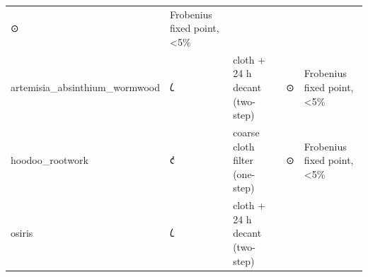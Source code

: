 \documentclass[12pt,a4paper]{article}
\begin{document}
\begin{longtable}[]{@{}lllll@{}}
\begin{minipage}[t]{0.17\columnwidth}
⊙\strut
\end{minipage} & \begin{minipage}[t]{0.17\columnwidth}\raggedright
Frobenius fixed point, \textless5\%\strut
\end{minipage}\tabularnewline
\begin{minipage}[t]{0.17\columnwidth}\raggedright
artemisia\_absinthium\_wormwood\strut
\end{minipage} & \begin{minipage}[t]{0.17\columnwidth}\raggedright
𐑖\strut
\end{minipage} & \begin{minipage}[t]{0.17\columnwidth}\raggedright
cloth + 24 h decant (two-step)\strut
\end{minipage} & \begin{minipage}[t]{0.17\columnwidth}\raggedright
⊙\strut
\end{minipage} & \begin{minipage}[t]{0.17\columnwidth}\raggedright
Frobenius fixed point, \textless5\%\strut
\end{minipage}\tabularnewline
\begin{minipage}[t]{0.17\columnwidth}\raggedright
hoodoo\_rootwork\strut
\end{minipage} & \begin{minipage}[t]{0.17\columnwidth}\raggedright
𐑒\strut
\end{minipage} & \begin{minipage}[t]{0.17\columnwidth}\raggedright
coarse cloth filter (one-step)\strut
\end{minipage} & \begin{minipage}[t]{0.17\columnwidth}\raggedright
⊙\strut
\end{minipage} & \begin{minipage}[t]{0.17\columnwidth}\raggedright
Frobenius fixed point, \textless5\%\strut
\end{minipage}\tabularnewline
\begin{minipage}[t]{0.17\columnwidth}\raggedright
osiris\strut
\end{minipage} & \begin{minipage}[t]{0.17\columnwidth}\raggedright
𐑖\strut
\end{minipage} & \begin{minipage}[t]{0.17\columnwidth}\raggedright
cloth + 24 h decant (two-step)\strut
\end{minipage} & \begin{minipage}[t]{0.17\columnwidth}\raggedright

\end{minipage}
\end{longtable}
\end{document}
